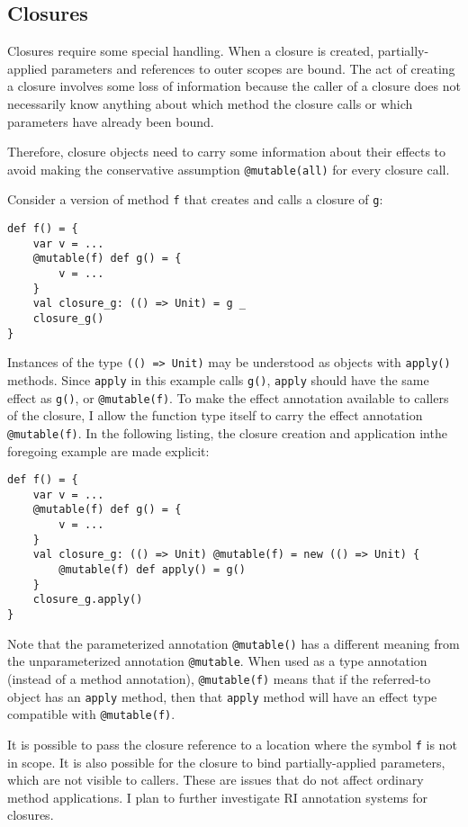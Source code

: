 \documentclass[letterpaper,11pt]{article}
\newcommand{\code}[1]{\lstinline$#1$}
\theoremstyle{definition}
\theoremstyle{remark}
\begin{document}
\subsection{Closures}

Closures require some special handling.
When a closure is created, partially-applied parameters and references to outer scopes are bound.
The act of creating a closure involves some loss of information
because the caller of a closure does not necessarily know anything about which
method the closure calls or which parameters have already been bound.

Therefore, closure objects need to carry some information about
their effects to avoid making the conservative assumption
\code{@mutable(all)} for every closure call.

Consider a version of method \code{f} that
creates and calls a closure of \code{g}:
\begin{lstlisting}
def f() = {
	var v = ...
	@mutable(f) def g() = {
		v = ...
	}
	val closure_g: (() => Unit) = g _
	closure_g()
}
\end{lstlisting}


Instances of the type \code{(() => Unit)} may be understood as objects with
\code{apply()} methods. Since \code{apply} in this example calls \code{g()},
\code{apply} should have the same effect as \code{g()}, or \code{@mutable(f)}.
To make the effect annotation available to callers of the closure,
I allow the function type itself to carry the effect annotation \code{@mutable(f)}.
In the following listing,
the closure creation and application inthe foregoing example are made explicit:
\begin{lstlisting}
def f() = {
	var v = ...
	@mutable(f) def g() = {
		v = ...
	}
	val closure_g: (() => Unit) @mutable(f) = new (() => Unit) {
		@mutable(f) def apply() = g()
	}
	closure_g.apply()
}
\end{lstlisting}

Note that the parameterized annotation \code{@mutable()}
has a different meaning from the unparameterized annotation \code{@mutable}.
When used as a type annotation (instead of a method annotation),
\code{@mutable(f)} means that if the referred-to object
has an \code{apply} method, then that \code{apply} method will have
an effect type compatible with \code{@mutable(f)}.

It is possible to pass the closure reference to a location where
the symbol \code{f} is not in scope.
It is also possible for the closure to bind partially-applied parameters,
which are not visible to callers.
These are issues that do not affect ordinary method applications.
I plan to further investigate RI annotation systems for closures.
\end{document}
